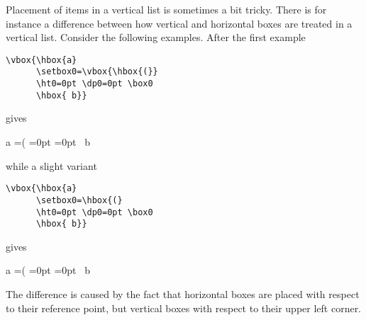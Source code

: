 \documentclass{book}
\begin{document}
Placement of items in a vertical list is sometimes
a bit tricky. There is for instance a difference between
how vertical and horizontal boxes are treated in a
vertical list. Consider the following examples.
After  the first example\begin{verbatim}
\vbox{\hbox{a}
      \setbox0=\vbox{\hbox{(}}
      \ht0=0pt \dp0=0pt \box0
      \hbox{ b}}
\end{verbatim}
gives \begin{disp}\offinterlineskip\leavevmode\vbox{\hbox{a}
      =\vbox{\hbox{(}}
      =0pt =0pt 
      \hbox{ b}}
\end{disp}
while a slight variant\begin{verbatim}
\vbox{\hbox{a}
      \setbox0=\hbox{(}
      \ht0=0pt \dp0=0pt \box0
      \hbox{ b}}
\end{verbatim}
gives
\begin{disp}\offinterlineskip\leavevmode\vbox{\hbox{a}
      =\hbox{(}
      =0pt =0pt
      \hbox{ b}}
\end{disp}
The difference is caused by the fact that horizontal boxes
are placed with respect to their reference point, but vertical
boxes with respect to their upper left corner.
\end{document}
